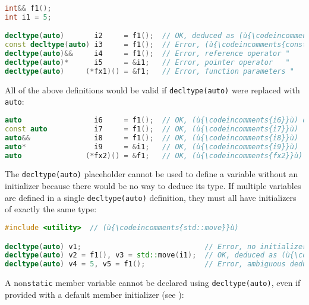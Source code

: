 \begin{lstlisting}[language=C++]
int&& f1();
int i1 = 5;

decltype(auto)       i2     = f1();  // OK, deduced as (ù{\codeincomments{int\&\&}}ù)
const decltype(auto) i3     = f1();  // Error, (ù{\codeincomments{const}}ù) qualifier not allowed
decltype(auto)&&     i4     = f1();  // Error, reference operator "     "
decltype(auto)*      i5     = &i1;   // Error, pointer operator   "     "
decltype(auto)     (*fx1)() = &f1;   // Error, function parameters "    "
\end{lstlisting}
    

All of the above definitions would be valid if \lstinline!decltype(auto)!
were replaced with \lstinline!auto!:

\begin{lstlisting}[language=C++]
auto                 i6     = f1();  // OK, (ù{\codeincomments{i6}}ù) deduced as (ù{\codeincomments{int}}ù)
const auto           i7     = f1();  // OK, (ù{\codeincomments{i7}}ù)    "     " (ù{\codeincomments{const int}}ù)
auto&&               i8     = f1();  // OK, (ù{\codeincomments{i8}}ù)    "     " (ù{\codeincomments{int\&\&}}ù)
auto*                i9     = &i1;   // OK, (ù{\codeincomments{i9}}ù)    "     " (ù{\codeincomments{int*}}ù)
auto               (*fx2)() = &f1;   // OK, (ù{\codeincomments{fx2}}ù)   "     " (ù{\codeincomments{int\&\& (*)()}}ù)
\end{lstlisting}
    

The \lstinline!decltype(auto)! placeholder cannot be used to define a
variable without an initializer because there would be no way to deduce
its type. If multiple variables are defined in a single
\lstinline!decltype(auto)! definition, they must all have initializers of
exactly the same type:

\begin{lstlisting}[language=C++]
#include <utility>  // (ù{\codeincomments{std::move}}ù)

decltype(auto) v1;                             // Error, no initializer
decltype(auto) v2 = f1(), v3 = std::move(i1);  // OK, deduced as (ù{\codeincomments{int\&\&}}ù)
decltype(auto) v4 = 5, v5 = f1();              // Error, ambiguous deduction
\end{lstlisting}
    

A non\lstinline!static! member variable cannot be declared using
\lstinline!decltype(auto)!, even if provided with a default member
initializer (see ):


